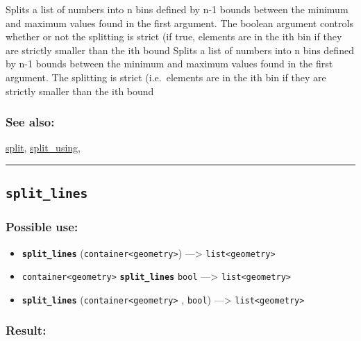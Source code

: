 \documentclass[]{book}
\providecommand{\tightlist}{%
  \setlength{\itemsep}{0pt}\setlength{\parskip}{0pt}}
\theoremstyle{definition}
\theoremstyle{definition}
\theoremstyle{definition}
\theoremstyle{remark}
\begin{document}
Splits a list of numbers into n bins defined by n-1 bounds between the
minimum and maximum values found in the first argument. The boolean
argument controls whether or not the splitting is strict (if true,
elements are in the ith bin if they are strictly smaller than the ith
bound Splits a list of numbers into n bins defined by n-1 bounds between
the minimum and maximum values found in the first argument. The
splitting is strict (i.e.~elements are in the ith bin if they are
strictly smaller than the ith bound

\subsubsection{See also:}\label{see-also-193}

\href{OperatorsSZ\#split}{split},
\href{OperatorsSZ\#split_using}{split\_using},

\begin{center}\rule{0.5\linewidth}{\linethickness}\end{center}

\subsection{\texorpdfstring{\texttt{split\_lines}}{split\_lines}}\label{split_lines}

\subsubsection{Possible use:}\label{possible-use-495}

\begin{itemize}
\tightlist
\item
  \textbf{\texttt{split\_lines}}
  (\texttt{container\textless{}geometry\textgreater{}})
  ---\textgreater{} \texttt{list\textless{}geometry\textgreater{}}
\item
  \texttt{container\textless{}geometry\textgreater{}}
  \textbf{\texttt{split\_lines}} \texttt{bool} ---\textgreater{}
  \texttt{list\textless{}geometry\textgreater{}}
\item
  \textbf{\texttt{split\_lines}}
  (\texttt{container\textless{}geometry\textgreater{}} , \texttt{bool})
  ---\textgreater{} \texttt{list\textless{}geometry\textgreater{}}
\end{itemize}

\subsubsection{Result:}\label{result-479}
\end{document}
